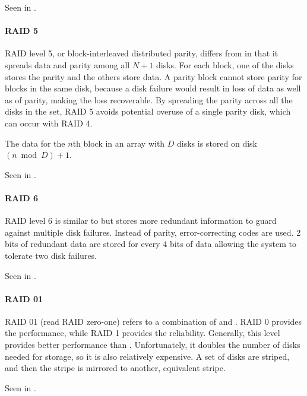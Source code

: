 Seen in .

\paragraph{RAID 5}\label{par:RAID_5}
RAID level 5, or block-interleaved distributed parity, differs from  in that it spreads data and parity among all $N + 1$ disks.
For each block, one of the disks stores the parity and the others store data.
A parity block cannot store parity for blocks in the same disk, because a disk failure would result in loss of data as well as of parity, making the loss recoverable.
By spreading the parity across all the disks in the set, RAID 5 avoids potential overuse of a single parity disk, which can occur with RAID 4.

The data for the $n$th block in an array with $D$ disks is stored on disk $(n \bmod D) + 1$.

Seen in .

\paragraph{RAID 6}\label{par:RAID_6}
RAID level 6 is similar to  but stores more redundant information to guard against multiple disk failures.
Instead of parity, error-correcting codes are used.
2 bits of redundant data are stored for every 4 bits of data allowing the system to tolerate two disk failures.

Seen in .

\paragraph{RAID 01}\label{par:RAID_01}
RAID 01 (read RAID zero-one) refers to a combination of  and .
RAID 0 provides the performance, while RAID 1 provides the reliability.
Generally, this level provides better performance than .
Unfortunately, it doubles the number of disks needed for storage, so it is also relatively expensive.
A set of disks are striped, and then the stripe is mirrored to another, equivalent stripe.

Seen in .


